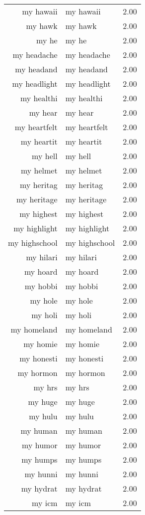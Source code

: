\begin{table}[ht]
\begin{tabular}{rlr}
  my hawaii & my hawaii & 2.00 \\ 
  my hawk & my hawk & 2.00 \\ 
  my he & my he & 2.00 \\ 
  my headache & my headache & 2.00 \\ 
  my headand & my headand & 2.00 \\ 
  my headlight & my headlight & 2.00 \\ 
  my healthi & my healthi & 2.00 \\ 
  my hear & my hear & 2.00 \\ 
  my heartfelt & my heartfelt & 2.00 \\ 
  my heartit & my heartit & 2.00 \\ 
  my hell & my hell & 2.00 \\ 
  my helmet & my helmet & 2.00 \\ 
  my heritag & my heritag & 2.00 \\ 
  my heritage & my heritage & 2.00 \\ 
  my highest & my highest & 2.00 \\ 
  my highlight & my highlight & 2.00 \\ 
  my highschool & my highschool & 2.00 \\ 
  my hilari & my hilari & 2.00 \\ 
  my hoard & my hoard & 2.00 \\ 
  my hobbi & my hobbi & 2.00 \\ 
  my hole & my hole & 2.00 \\ 
  my holi & my holi & 2.00 \\ 
  my homeland & my homeland & 2.00 \\ 
  my homie & my homie & 2.00 \\ 
  my honesti & my honesti & 2.00 \\ 
  my hormon & my hormon & 2.00 \\ 
  my hrs & my hrs & 2.00 \\ 
  my huge & my huge & 2.00 \\ 
  my hulu & my hulu & 2.00 \\ 
  my human & my human & 2.00 \\ 
  my humor & my humor & 2.00 \\ 
  my humps & my humps & 2.00 \\ 
  my hunni & my hunni & 2.00 \\ 
  my hydrat & my hydrat & 2.00 \\ 
  my icm & my icm & 2.00 \\ 

\end{tabular}
\end{table}
